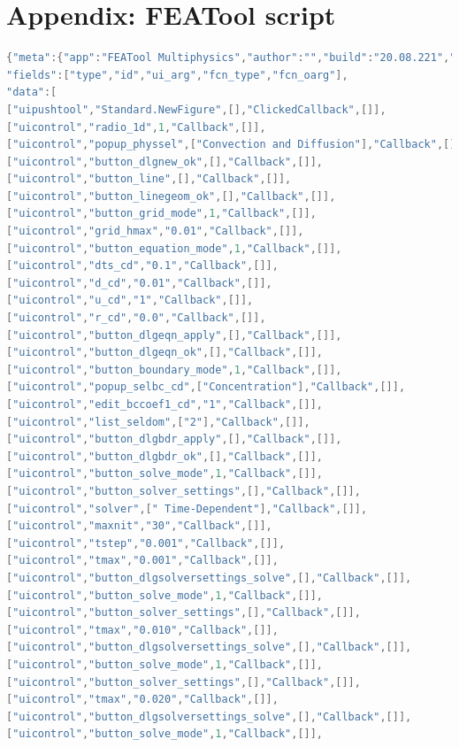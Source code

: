 \documentclass{article}
\begin{document}
\section*{Appendix: FEATool script}
\begin{lstlisting}[language=C]
{"meta":{"app":"FEATool Multiphysics","author":"","build":"20.08.221","date":"30-Aug-2020","descr":"HW03_FEATool","dim":1,"image":"","keyw":["conv","diff"],"mlver":"9.5.0.944444 (R2018b)","name":"HW03_FEATool","phys":["Convection and Diffusion"],"system":"PCWIN64","time":738033.60121716431,"title":"HW03_FEATool","type":"Convection and Diffusion","user":"","ver":[1,12,4]},
"fields":["type","id","ui_arg","fcn_type","fcn_oarg"],
"data":[
["uipushtool","Standard.NewFigure",[],"ClickedCallback",[]],
["uicontrol","radio_1d",1,"Callback",[]],
["uicontrol","popup_physsel",["Convection and Diffusion"],"Callback",[]],
["uicontrol","button_dlgnew_ok",[],"Callback",[]],
["uicontrol","button_line",[],"Callback",[]],
["uicontrol","button_linegeom_ok",[],"Callback",[]],
["uicontrol","button_grid_mode",1,"Callback",[]],
["uicontrol","grid_hmax","0.01","Callback",[]],
["uicontrol","button_equation_mode",1,"Callback",[]],
["uicontrol","dts_cd","0.1","Callback",[]],
["uicontrol","d_cd","0.01","Callback",[]],
["uicontrol","u_cd","1","Callback",[]],
["uicontrol","r_cd","0.0","Callback",[]],
["uicontrol","button_dlgeqn_apply",[],"Callback",[]],
["uicontrol","button_dlgeqn_ok",[],"Callback",[]],
["uicontrol","button_boundary_mode",1,"Callback",[]],
["uicontrol","popup_selbc_cd",["Concentration"],"Callback",[]],
["uicontrol","edit_bccoef1_cd","1","Callback",[]],
["uicontrol","list_seldom",["2"],"Callback",[]],
["uicontrol","button_dlgbdr_apply",[],"Callback",[]],
["uicontrol","button_dlgbdr_ok",[],"Callback",[]],
["uicontrol","button_solve_mode",1,"Callback",[]],
["uicontrol","button_solver_settings",[],"Callback",[]],
["uicontrol","solver",[" Time-Dependent"],"Callback",[]],
["uicontrol","maxnit","30","Callback",[]],
["uicontrol","tstep","0.001","Callback",[]],
["uicontrol","tmax","0.001","Callback",[]],
["uicontrol","button_dlgsolversettings_solve",[],"Callback",[]],
["uicontrol","button_solve_mode",1,"Callback",[]],
["uicontrol","button_solver_settings",[],"Callback",[]],
["uicontrol","tmax","0.010","Callback",[]],
["uicontrol","button_dlgsolversettings_solve",[],"Callback",[]],
["uicontrol","button_solve_mode",1,"Callback",[]],
["uicontrol","button_solver_settings",[],"Callback",[]],
["uicontrol","tmax","0.020","Callback",[]],
["uicontrol","button_dlgsolversettings_solve",[],"Callback",[]],
["uicontrol","button_solve_mode",1,"Callback",[]],

\end{lstlisting}
\end{document}
